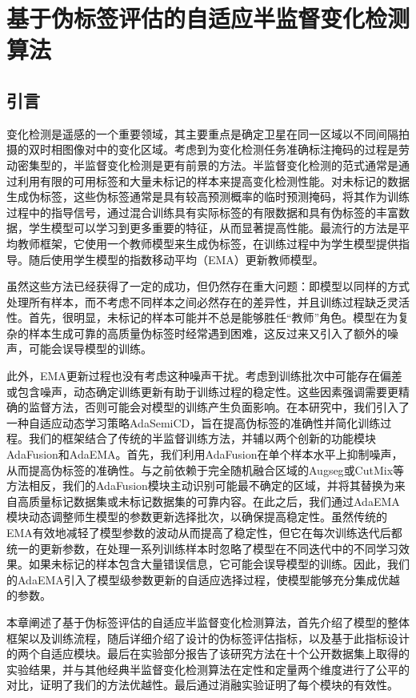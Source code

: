 \documentclass[lang=chs, degree=master, blindreview=false, adobe=false]{yanputhesis}
\begin{document}
\chapter{基于伪标签评估的自适应半监督变化检测算法}
\section{引言}
变化检测是遥感的一个重要领域，其主要重点是确定卫星在同一区域以不同间隔拍摄的双时相图像对中的变化区域。考虑到为变化检测任务准确标注掩码的过程是劳动密集型的，半监督变化检测是更有前景的方法。半监督变化检测的范式通常是通过利用有限的可用标签和大量未标记的样本来提高变化检测性能。对未标记的数据生成伪标签，这些伪标签通常是具有较高预测概率的临时预测掩码，将其作为训练过程中的指导信号，通过混合训练具有实际标签的有限数据和具有伪标签的丰富数据，学生模型可以学习到更多重要的特征，从而显著提高性能。最流行的方法是平均教师\cite{Tarvainen2017teacher}框架，它使用一个教师模型来生成伪标签，在训练过程中为学生模型提供指导。随后使用学生模型的指数移动平均（EMA）更新教师模型。

虽然这些方法已经获得了一定的成功，但仍然存在重大问题：即模型以同样的方式处理所有样本，而不考虑不同样本之间必然存在的差异性，并且训练过程缺乏灵活性。首先，很明显，未标记的样本可能并不总是能够胜任“教师”角色。模型在为复杂的样本生成可靠的高质量伪标签时经常遇到困难，这反过来又引入了额外的噪声，可能会误导模型的训练。

此外，EMA更新过程也没有考虑这种噪声干扰。考虑到训练批次中可能存在偏差或包含噪声，动态确定训练更新有助于训练过程的稳定性。这些因素强调需要更精确的监督方法，否则可能会对模型的训练产生负面影响。在本研究中，我们引入了一种自适应动态学习策略AdaSemiCD，旨在提高伪标签的准确性并简化训练过程。我们的框架结合了传统的半监督训练方法，并辅以两个创新的功能模块AdaFusion和AdaEMA。首先，我们利用AdaFusion在单个样本水平上抑制噪声，从而提高伪标签的准确性。与之前依赖于完全随机融合区域的Augseg\cite{zhao2023AugSeg}或CutMix\cite{yun2019cutmix}等方法相反，我们的AdaFusion模块主动识别可能最不确定的区域，并将其替换为来自高质量标记数据集或未标记数据集的可靠内容。在此之后，我们通过AdaEMA模块动态调整师生模型的参数更新选择批次，以确保提高稳定性。虽然传统的EMA有效地减轻了模型参数的波动从而提高了稳定性，但它在每次训练迭代后都统一的更新参数，在处理一系列训练样本时忽略了模型在不同迭代中的不同学习效果。如果未标记的样本包含大量错误信息，它可能会误导模型的训练。因此，我们的AdaEMA引入了模型级参数更新的自适应选择过程，使模型能够充分集成优越的参数。

本章阐述了基于伪标签评估的自适应半监督变化检测算法，首先介绍了模型的整体框架以及训练流程，随后详细介绍了设计的伪标签评估指标，以及基于此指标设计的两个自适应模块。最后在实验部分报告了该研究方法在十个公开数据集上取得的实验结果，并与其他经典半监督变化检测算法在定性和定量两个维度进行了公平的对比，证明了我们的方法优越性。最后通过消融实验证明了每个模块的有效性。
\end{document}
